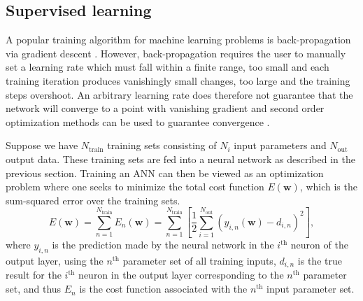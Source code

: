 \documentclass[useAMS,usenatbib]{mnras}
\begin{document}
\subsection{Supervised learning}

A popular training algorithm for machine learning problems is back-propagation via gradient descent \citep{Rumelhart1986,Cheng1994,Abu-Mostafa2012, shimabukuro2017}.
However, back-propagation requires the user to manually set a learning rate which must fall within a finite range, too small and each training iteration produces vanishingly small changes, too large and the training steps overshoot. 
An arbitrary learning rate does therefore not guarantee that the network will converge to a point with vanishing gradient and second order optimization methods can be used to guarantee convergence \citep{Battiti1992a}.

Suppose we have $N_\text{train}$ training sets consisting of $N_i$ input parameters and $N_\text{out}$ output data. These training sets are fed into a neural network as described in the previous section. 
Training an ANN can then be viewed as an optimization problem where one seeks to minimize the total cost function $E(\boldsymbol{w})$, which is the sum-squared error over the training sets.
\begin{equation}\label{eq: definition E}
E(\boldsymbol{w}) = \sum\limits_{n = 1}^{N_\text{train}} E_n(\boldsymbol{w}) =\sum\limits_{n = 1}^{N_\text{train}} \left[\frac{1}{2} \sum\limits_{i = 1}^{N_\text{out}} \left(y_{i,n}(\boldsymbol{w}) - d_{i,n}\right)^2\right],
\end{equation}
where $y_{i,n}$ is the prediction made by the neural network in the $i^\text{th}$ neuron of the output layer, using the $n^\text{th}$ parameter set of all training inputs, $d_{i,n}$ is the true result for the $i^\text{th}$ neuron in the output layer corresponding to the $n^\text{th}$ parameter set, and thus $E_n$ is the cost function associated with the $n^\text{th}$ input  parameter set.
\end{document}

